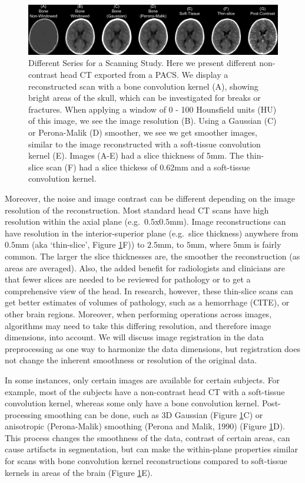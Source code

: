 \documentclass[utf8]{frontiersSCNS}
\begin{document}
\begin{figure}
\includegraphics[width=1\linewidth]{overlaid_slices} \caption{Different Series for a Scanning Study.  Here we present different non-contrast head CT exported from a PACS.  We display a reconstructed scan with a bone convolution kernel (A), showing bright areas of the skull, which can be investigated for breaks or fractures.  When applying a window of 0 - 100 Hounsfield units (HU) of this image, we see the image resolution (B).  Using a Gaussian (C) or Perona-Malik (D) smoother, we see we get smoother images, similar to the image reconstructed with a soft-tissue convolution kernel (E).  Images (A-E) had a slice thickness of 5mm.  The thin-slice scan (F) had a slice thickess of 0.62mm and a soft-tissue convolution kernel.}\label{fig:overlay}
\end{figure}

Moreover, the noise and image contrast can be different depending on the image resolution of the reconstruction. Most standard head CT scans have high resolution within the axial plane (e.g.~\(0.5\)x\(0.5\)mm). Image reconstructions can have resolution in the interior-superior plane (e.g.~slice thickness) anywhere from \(0.5\)mm (aka `thin-slice', Figure \ref{fig:overlay}F)) to \(2.5\)mm, to \(5\)mm, where \(5\)mm is fairly common. The larger the slice thicknesses are, the smoother the reconstruction (as areas are averaged). Also, the added benefit for radiologists and clinicians are that fewer slices are needed to be reviewed for pathology or to get a comprehensive view of the head. In research, however, these thin-slice scans can get better estimates of volumes of pathology, such as a hemorrhage (CITE), or other brain regions. Moreover, when performing operations across images, algorithms may need to take this differing resolution, and therefore image dimensions, into account. We will discuss image registration in the data preprocessing as one way to harmonize the data dimensions, but registration does not change the inherent smoothness or resolution of the original data.

In some instances, only certain images are available for certain subjects. For example, most of the subjects have a non-contrast head CT with a soft-tissue convolution kernel, whereas some only have a bone convolution kernel. Post-processing smoothing can be done, such as 3D Gaussian (Figure \ref{fig:overlay}C) or anisotropic (Perona-Malik) smoothing (Perona and Malik, 1990) (Figure \ref{fig:overlay}D). This process changes the smoothness of the data, contrast of certain areas, can cause artifacts in segmentation, but can make the within-plane properties similar for scans with bone convolution kernel reconstructions compared to soft-tissue kernels in areas of the brain (Figure \ref{fig:overlay}E).
\end{document}
